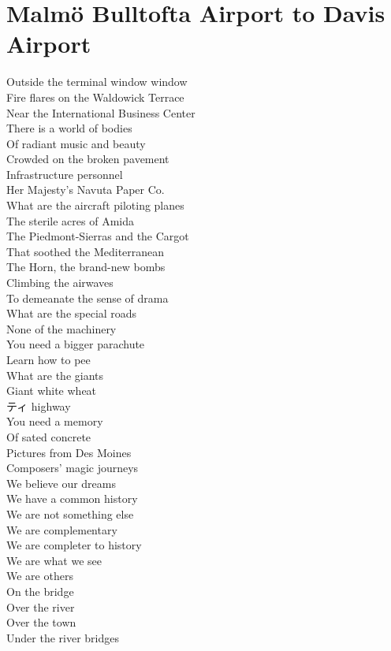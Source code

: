 \documentclass[smalldemyvopaper,11pt,twoside,onecolumn,openright,extrafontsizes]{memoir}
\begin{document}
\chapter{Malmö Bulltofta Airport to Davis Airport}
Outside the terminal window window
\\Fire flares on the Waldowick Terrace
\\Near the International Business Center
\\There is a world of bodies
\\Of radiant music and beauty
\\Crowded on the broken pavement
\\Infrastructure personnel
\\Her Majesty's Navuta Paper Co.
\\What are the aircraft piloting planes
\\The sterile acres of Amida
\\The Piedmont-Sierras and the Cargot
\\That soothed the Mediterranean
\\The Horn, the brand-new bombs
\\Climbing the airwaves
\\To demeanate the sense of drama
\\What are the special roads
\\None of the machinery
\\You need a bigger parachute
\\Learn how to pee
\\What are the giants
\\Giant white wheat
\\ティ highway
\\You need a memory
\\Of sated concrete
\\Pictures from Des Moines
\\Composers' magic journeys
\\We believe our dreams
\\We have a common history
\\We are not something else
\\We are complementary
\\We are completer to history
\\We are what we see
\\We are others
\\On the bridge
\\Over the river
\\Over the town
\\Under the river bridges
\end{document}
